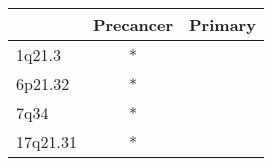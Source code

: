 \begin{tabular}{lcc}
\toprule
{} & Precancer & Primary \\
\midrule
1q21.3   &         * &         \\
6p21.32  &         * &         \\
7q34     &         * &         \\
17q21.31 &         * &         \\
\bottomrule
\end{tabular}
